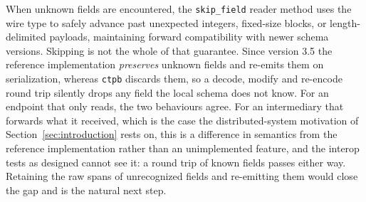 When unknown fields are encountered, the \texttt{skip\_field} reader method uses the wire type to safely advance past unexpected integers, fixed-size blocks, or length-delimited payloads, maintaining forward compatibility with newer schema versions. Skipping is not the whole of that guarantee. Since version 3.5 the reference implementation \emph{preserves} unknown fields and re-emits them on serialization, whereas \texttt{ctpb} discards them, so a decode, modify and re-encode round trip silently drops any field the local schema does not know. For an endpoint that only reads, the two behaviours agree. For an intermediary that forwards what it received, which is the case the distributed-system motivation of Section~\ref{sec:introduction} rests on, this is a difference in semantics from the reference implementation rather than an unimplemented feature, and the interop tests as designed cannot see it: a round trip of known fields passes either way. Retaining the raw spans of unrecognized fields and re-emitting them would close the gap and is the natural next step.

